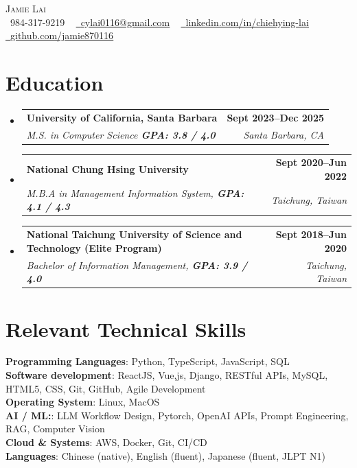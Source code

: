 \documentclass[letterpaper,11pt]{article}
\makeatletter
\newcommand{\resumeSubheading}[4]{
  \vspace{-2pt}\item
    \begin{tabular*}{1.0\textwidth}[t]{l@{\extracolsep{\fill}}r}
      \textbf{#1} & \textbf{\small #2} \\
      \textit{\small#3} & \textit{\small #4} \\
    \end{tabular*}\vspace{-7pt}
}
\newcommand{\resumeSubHeadingListStart}{\begin{itemize}[leftmargin=0.0in, label={}]}
\newcommand{\resumeSubHeadingListEnd}{\end{itemize}}
\makeatother
\begin{document}
\begin{center}
    {\Huge \scshape Jamie Lai} \\ \vspace{5pt}
    \small \raisebox{-0.1\height}\faPhone\ 984-317-9219 ~ \href{mailto:cylai0116@gmail.com}{\raisebox{-0.2\height}\faEnvelope\  \underline{cylai0116@gmail.com}} ~ 
    \href{https://www.linkedin.com/in/chiehying-lai/}{\raisebox{-0.2\height}\faLinkedin\ \underline{linkedin.com/in/chiehying-lai}}  ~
    \href{https://github.com/jamie870116}{\raisebox{-0.2\height}\faGithub\ \underline{github.com/jamie870116}}
    \vspace{-8pt}
\end{center}




\section{Education}
  \resumeSubHeadingListStart
    \resumeSubheading
      {University of California, Santa Barbara}{Sept 2023–Dec 2025}
      {M.S. in Computer Science \textbf{GPA: 3.8 / 4.0}}{Santa Barbara, CA}
    \resumeSubheading
      {National Chung Hsing University}{Sept 2020–Jun 2022}
      {M.B.A in Management Information System, \textbf{GPA: 4.1 / 4.3}}{Taichung, Taiwan}
    \resumeSubheading
      {National Taichung University of Science and Technology (Elite Program)}{Sept 2018–Jun 2020}
      {Bachelor of Information Management, \textbf{GPA: 3.9 / 4.0}}{Taichung, Taiwan}
  \resumeSubHeadingListEnd

\section{Relevant Technical Skills}
 \begin{itemize}[leftmargin=0in, label={}]
 
    \small{\item{
    \textbf{Programming Languages}{: Python, TypeScript, JavaScript, SQL} \\

    \textbf{Software development}{: 
    ReactJS, Vue,js, Django, RESTful APIs, MySQL, HTML5, CSS, Git, GitHub, Agile Development
    } \\
    \textbf{Operating System}{: 
    Linux, MacOS
    } \\
    
    \textbf{AI / ML:}{: LLM Workflow Design, Pytorch, OpenAI APIs, Prompt Engineering, RAG, Computer Vision}\\
    \textbf{Cloud \& Systems}{: 
    AWS, Docker, Git, CI/CD
    } \\
    
     \textbf{Languages}{:  Chinese (native), English (fluent), Japanese (fluent, JLPT N1)} \\
    }}
 \end{itemize}
\end{document}

